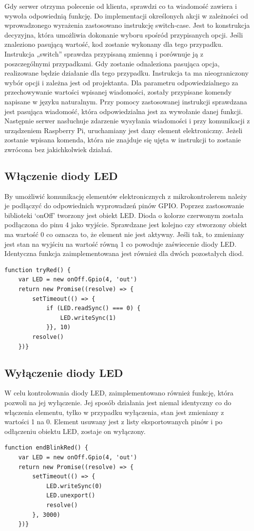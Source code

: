 Gdy serwer otrzyma polecenie od klienta, sprawdzi co ta wiadomość zawiera i wywoła odpowiednią funkcję. Do implementacji określonych akcji w zależności od wprowadzonego wyrażenia zastosowano instrukcję switch-case. Jest to konstrukcja decyzyjna, która umożliwia dokonanie wyboru spośród przypisanych opcji. Jeśli znaleziono pasującą wartość, kod zostanie wykonany dla tego przypadku. Instrukcja „switch” sprawdza przypisaną zmienną i porównuje ją z poszczególnymi przypadkami. Gdy zostanie odnaleziona pasująca opcja, realizowane będzie działanie dla tego przypadku. Instrukcja ta ma nieograniczony wybór opcji i zależna jest od projektanta. Dla parametru odpowiedzialnego za przechowywanie wartości wpisanej wiadomości, zostały przypisane komendy napisane w języku naturalnym. Przy pomocy zastosowanej instrukcji sprawdzana jest pasująca wiadomość, która odpowiedzialna jest za wywołanie danej funkcji. Następnie serwer nasłuchuje zdarzenie wysyłania wiadomości i przy komunikacji z urządzeniem Raspberry Pi, uruchamiany jest dany element elektroniczny. Jeżeli zostanie wpisana komenda, która nie znajduje się ujęta w instrukcji to zostanie zwrócona bez jakichkolwiek działań.

\subsection{Włączenie diody LED}
By umożliwić komunikację elementów elektronicznych z mikrokontrolerem należy je podłączyć do odpowiednich wyprowadzeń pinów GPIO. Poprzez zastosowanie biblioteki ‘onOff’ tworzony jest obiekt LED. Dioda o kolorze czerwonym została podłączona do pinu 4 jako wyjście. Sprawdzane jest kolejno czy stworzony obiekt ma wartość 0 co oznacza to, że element nie jest aktywny. Jeśli tak, to zmieniany jest stan na wyjściu na wartość równą 1 co powoduje zaświecenie diody LED. Identyczna funkcja zaimplementowana jest również dla dwóch pozostałych diod.
\begin{lstlisting}[caption=Implementacja funkcji wlaczajacej diode]
function tryRed() {
    var LED = new onOff.Gpio(4, 'out')
    return new Promise((resolve) => {
        setTimeout(() => {
            if (LED.readSync() === 0) {
                LED.writeSync(1)
            }}, 10)
        resolve()
    })}
\end{lstlisting}

\subsection{Wyłączenie diody LED}
W celu kontrolowania diody LED, zaimplementowano również funkcję, która pozwoli na jej wyłączenie. Jej sposób działania jest niemal identyczny co do włączenia elementu, tylko w przypadku wyłączenia, stan jest zmieniany z wartości 1 na 0. Element usuwany jest z listy eksportowanych pinów i po odłączeniu obiektu LED, zostaje on wyłączony.
\begin{lstlisting}[caption=Implementacja funkcji wylaczajacej diode]
function endBlinkRed() {
    var LED = new onOff.Gpio(4, 'out')
    return new Promise((resolve) => {
        setTimeout(() => {
            LED.writeSync(0)
            LED.unexport()
            resolve()
        }, 3000)
    })}
\end{lstlisting}
\newpage
